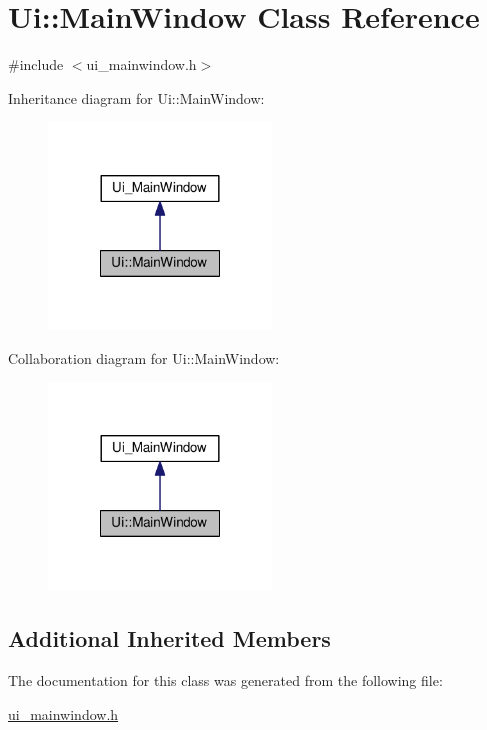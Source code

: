 \hypertarget{classUi_1_1MainWindow}{\section{Ui\-:\-:Main\-Window Class Reference}
\label{classUi_1_1MainWindow}
}


{\ttfamily \#include $<$ui\-\_\-mainwindow.\-h$>$}



Inheritance diagram for Ui\-:\-:Main\-Window\-:\nopagebreak
\begin{figure}[H]
\begin{center}
\leavevmode
\includegraphics[width=168pt]{classUi_1_1MainWindow__inherit__graph}
\end{center}
\end{figure}


Collaboration diagram for Ui\-:\-:Main\-Window\-:\nopagebreak
\begin{figure}[H]
\begin{center}
\leavevmode
\includegraphics[width=168pt]{classUi_1_1MainWindow__coll__graph}
\end{center}
\end{figure}
\subsection*{Additional Inherited Members}


The documentation for this class was generated from the following file\-:\begin{DoxyCompactItemize}
\item 
\hyperlink{ui__mainwindow_8h}{ui\-\_\-mainwindow.\-h}\end{DoxyCompactItemize}
